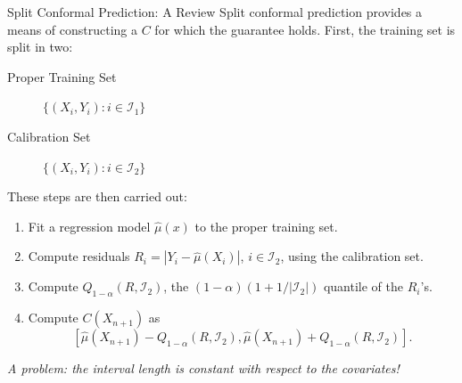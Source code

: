 \documentclass{beamer}
\begin{document}
\begin{frame}{Split Conformal Prediction: A Review}
    Split conformal prediction provides a means of constructing a $C$ for which the guarantee holds. First, the training set is split in two:
    \begin{description}
        \item[Proper Training Set] $\{(X_i, Y_i): i \in \mathcal{I}_1\}$
        \item[Calibration Set] $\{(X_i, Y_i): i \in \mathcal{I}_2\}$
    \end{description}

    These steps are then carried out:
    \begin{enumerate}
        \item Fit a regression model $\widehat{\mu}(x)$ to the proper training set.
        \item Compute residuals $R_i = |Y_i - \widehat{\mu}(X_i)|$, $i \in \mathcal{I}_2$, using the calibration set.
        \item Compute $Q_{1 - \alpha}(R, \mathcal{I}_2)$, the $(1 - \alpha)(1 + 1 / |\mathcal{I}_2|)$ quantile of the $R_i$'s.
        \item Compute $C(X_{n + 1})$ as
        \[
        [\widehat{\mu}(X_{n + 1}) - Q_{1 - \alpha}(R, \mathcal{I}_2), \widehat{\mu}(X_{n + 1}) + Q_{1 - \alpha}(R, \mathcal{I}_2)].
        \]
    \end{enumerate}
    \emph{A problem: the interval length is constant with respect to the covariates!}
\end{frame}
\end{document}
